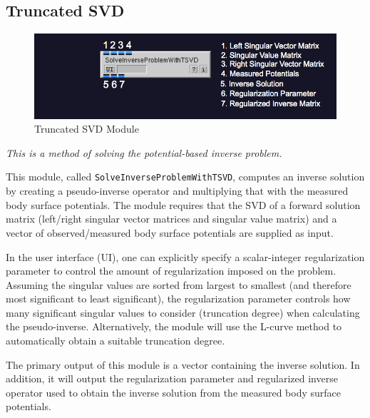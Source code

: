 \documentclass[fleqn,11pt,openany]{book}
\begin{document}
\subsection{Truncated SVD}

\begin{figure}[H]
\begin{center}
\includegraphics[width=\textwidth]{ECGToolkitGuide_figures/SolveInverseProblemWithTSVD.png}
\caption{Truncated SVD Module}
\label{tsvd}
\end{center}
\end{figure}

\vspace{5pt}\textit{This is a method of solving the potential-based inverse problem.}\vspace{5pt}

This module, called {\tt SolveInverseProblemWithTSVD}, computes an inverse solution by creating a pseudo-inverse operator and multiplying that with the measured body surface potentials. The module requires that the SVD of a forward solution matrix (left/right singular vector matrices and singular value matrix) and a vector of observed/measured body surface potentials are supplied as input.

In the user interface (UI), one can explicitly specify a scalar-integer regularization parameter to control the amount of regularization imposed on the problem. Assuming the singular values are sorted from largest to smallest (and therefore most significant to least significant), the regularization parameter controls how many significant singular values to consider (truncation degree) when calculating the pseudo-inverse. Alternatively, the module will use the L-curve method to automatically obtain a suitable truncation degree.

The primary output of this module is a vector containing the inverse solution. In addition, it will output the regularization parameter and regularized inverse operator used to obtain the inverse solution from the measured body surface potentials.

\end{document}
